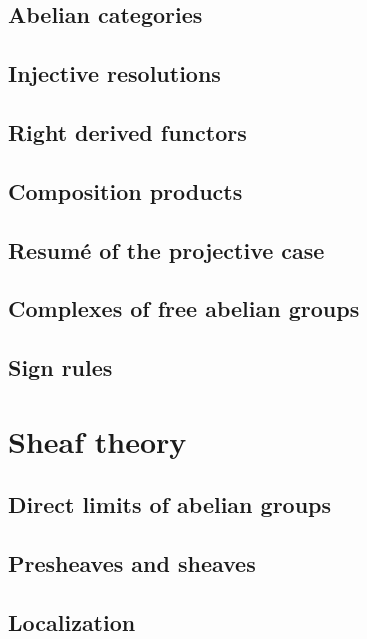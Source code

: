 \documentclass[5pt]{article}
\theoremstyle{definition}
\theoremstyle{remark}
\begin{document}
	\subsection{Abelian categories}
	
	\subsection{Injective resolutions}
	
	\subsection{Right derived functors}
	
	\subsection{Composition products}
	
	\subsection{Resumé of the projective case}
	
	\subsection{Complexes of free abelian groups}
	
	\subsection{Sign rules}
	
	\newpage
	
	\section{Sheaf theory}
	
	\setcounter{subsection}{-1}
	
	\subsection{Direct limits of abelian groups}
	
	\subsection{Presheaves and sheaves}
	
	\subsection{Localization}
	
\end{document}
